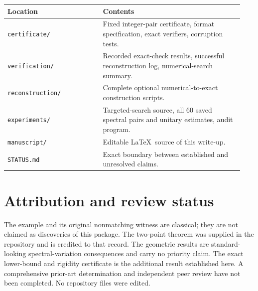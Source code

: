 \documentclass[11pt]{article}
\theoremstyle{definition}\newtheorem{definition}[theorem]{Definition}
\theoremstyle{remark}\newtheorem{remark}[theorem]{Remark}
\begin{document}
\begin{center}
\begin{tabular}{@{}p{0.38\linewidth}p{0.56\linewidth}@{}}
\toprule
Location & Contents\\
\midrule
\texttt{certificate/} & Fixed integer-pair certificate, format specification, exact verifiers, corruption tests.\\
\texttt{verification/} & Recorded exact-check results, successful reconstruction log, numerical-search summary.\\
\texttt{reconstruction/} & Complete optional numerical-to-exact construction scripts.\\
\texttt{experiments/} & Targeted-search source, all 60 saved spectral pairs and unitary estimates, audit program.\\
\texttt{manuscript/} & Editable \LaTeX\ source of this write-up.\\
\texttt{STATUS.md} & Exact boundary between established and unresolved claims.\\
\bottomrule
\end{tabular}
\end{center}

\section{Attribution and review status}
The example and its original nonmatching witness are classical; they are not claimed as discoveries of this package. The two-point theorem was supplied in the repository and is credited to that record. The geometric results are standard-looking spectral-variation consequences and carry no priority claim. The exact lower-bound and rigidity certificate is the additional result established here. A comprehensive prior-art determination and independent peer review have not been completed. No repository files were edited.
\end{document}
